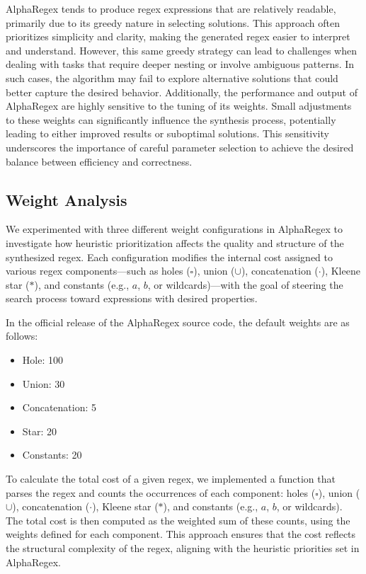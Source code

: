 \indent\indent AlphaRegex tends to produce regex expressions that are relatively readable, primarily due to its greedy nature in selecting solutions. This approach often prioritizes simplicity and clarity, making the generated regex easier to interpret and understand. However, this same greedy strategy can lead to challenges when dealing with tasks that require deeper nesting or involve ambiguous patterns. In such cases, the algorithm may fail to explore alternative solutions that could better capture the desired behavior. Additionally, the performance and output of AlphaRegex are highly sensitive to the tuning of its weights. Small adjustments to these weights can significantly influence the synthesis process, potentially leading to either improved results or suboptimal solutions. This sensitivity underscores the importance of careful parameter selection to achieve the desired balance between efficiency and correctness.


\subsection{Weight Analysis}

\indent\indent We experimented with three different weight configurations in AlphaRegex to investigate how heuristic prioritization affects the quality and structure of the synthesized regex. Each configuration modifies the internal cost assigned to various regex components—such as holes ($\square$), union ($\cup$), concatenation ($\cdot$), Kleene star ($*$), and constants (e.g., $a$, $b$, or wildcards)—with the goal of steering the search process toward expressions with desired properties.

\indent\indent In the official release of the AlphaRegex source code, the default weights are as follows:

\begin{itemize}
\item Hole: 100
\item Union: 30
\item Concatenation: 5
\item Star: 20
\item Constants: 20
\end{itemize}

\indent\indent To calculate the total cost of a given regex, we implemented a function that parses the regex and counts the occurrences of each component: holes ($\square$), union ($\cup$), concatenation ($\cdot$), Kleene star ($*$), and constants (e.g., $a$, $b$, or wildcards). The total cost is then computed as the weighted sum of these counts, using the weights defined for each component. This approach ensures that the cost reflects the structural complexity of the regex, aligning with the heuristic priorities set in AlphaRegex.

